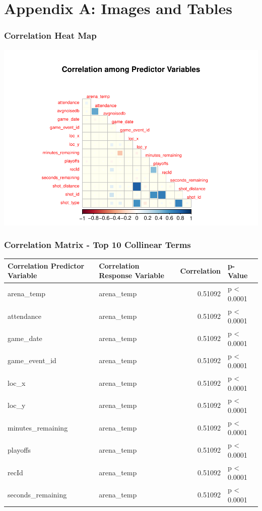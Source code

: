 \documentclass[american,]{article}
\begin{document}
\newpage

\hypertarget{appendix-a-images-and-tables}{%
\section{Appendix A: Images and Tables}\label{appendix-a-images-and-tables}}

\hypertarget{correlation-heat-map}{%
\subsubsection{Correlation Heat Map}\label{correlation-heat-map}}

\includegraphics{Final_Project_Applied_files/figure-latex/Heatmap for Appendix-1.pdf}

\hypertarget{correlation-matrix---top-10-collinear-terms}{%
\subsubsection{Correlation Matrix - Top 10 Collinear Terms}\label{correlation-matrix---top-10-collinear-terms}}

\begin{table}[!h]
\centering
\begin{tabular}{llrl}
\toprule
Correlation Predictor Variable & Correlation Response Variable & Correlation & p-Value\\
\midrule
arena\_temp & arena\_temp & 0.51092 & p < 0.0001\\
attendance & arena\_temp & 0.51092 & p < 0.0001\\
game\_date & arena\_temp & 0.51092 & p < 0.0001\\
game\_event\_id & arena\_temp & 0.51092 & p < 0.0001\\
loc\_x & arena\_temp & 0.51092 & p < 0.0001\\
\addlinespace
loc\_y & arena\_temp & 0.51092 & p < 0.0001\\
minutes\_remaining & arena\_temp & 0.51092 & p < 0.0001\\
playoffs & arena\_temp & 0.51092 & p < 0.0001\\
recId & arena\_temp & 0.51092 & p < 0.0001\\
seconds\_remaining & arena\_temp & 0.51092 & p < 0.0001\\
\bottomrule
\end{tabular}
\end{table}
\end{document}
